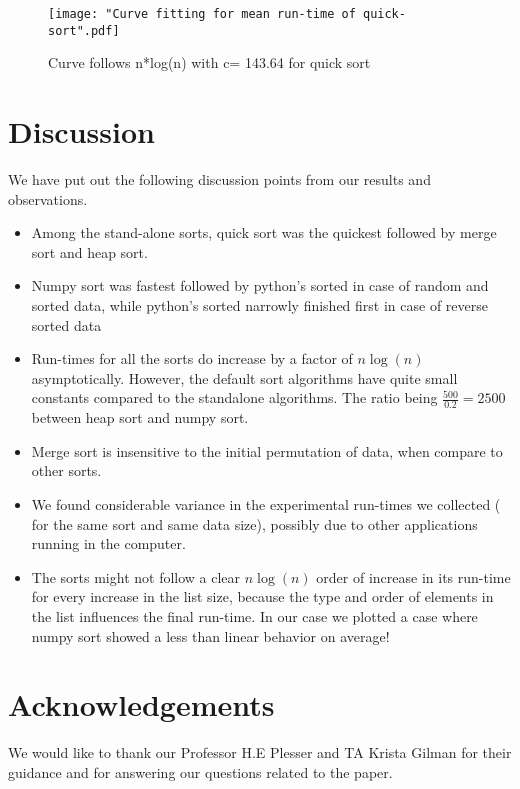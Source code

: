 \documentclass[sigconf, nonacm, natbib, screen, balance=False]{acmart}
\begin{document}
\begin{figure}[ht]
\texttt{[image: "Curve fitting for mean run-time of quick-sort".pdf]}
    \caption{Curve follows n*log(n) with c= 143.64 for quick sort}
    \label{fig:curvefit}
\end{figure}

\section{Discussion}\label{sec:discussion}
We have put out the following discussion points from our results and observations.

\begin{itemize}
\item Among the stand-alone sorts, quick sort was the quickest followed by merge sort and heap sort.
\item Numpy sort was fastest followed by python's sorted in case of random and sorted data, while python's sorted narrowly finished first in case of reverse sorted data
\item Run-times for all the sorts do increase by a factor of $n\log(n)$ asymptotically. However, the default sort algorithms have quite small constants compared to the standalone algorithms. The ratio being $\frac{500}{0.2} = 2500$ between heap sort and numpy sort.
\item Merge sort is insensitive to the initial permutation of data, when compare to other sorts.
\item We found considerable variance in the experimental run-times we collected ( for the same sort and same data size), possibly due to other applications running in the computer.
\item The sorts might not follow a clear $n\log(n)$ order of increase in its run-time for every increase in the list size, because the type and order of elements in the list influences the final run-time. In our case we plotted a case where numpy sort showed a less than linear behavior on average!
\end{itemize}

\section{Acknowledgements}\label{sec:acknowledgements}
We would like to thank our Professor H.E Plesser and TA Krista Gilman for their guidance and for answering our questions related to the paper. 



\end{document}
